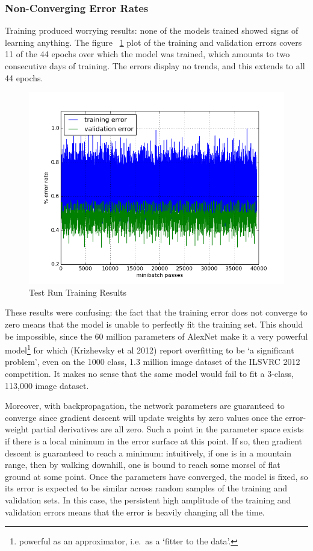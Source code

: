 \documentclass[a4paper,11pt]{article}
\begin{document}
\subsubsection{Non-Converging Error Rates}

Training produced worrying results: none of the models trained showed signs of learning anything. The figure ~\ref{f28} plot of the training and validation errors covers 11 of the 44 epochs over which the model was trained, which amounts to two consecutive days of training. The errors display no trends, and this extends to all 44 epochs.

\begin{figure}[!h]
	\centering
	\includegraphics[scale=0.5]{images/test_run.png}
	\caption{Test Run Training Results}
    \label{f28}
\end{figure}

These results were confusing: the fact that the training error does not converge to zero means that the model is unable to perfectly fit the training set. This should be impossible, since the 60 million parameters of AlexNet make it a very powerful model\footnote{powerful as an approximator, i.e.\ as a `fitter to the data'.} for which (Krizhevsky et al 2012) report overfitting to be `a significant problem', even on the 1000 class, 1.3 million image dataset of the ILSVRC 2012 competition. It makes no sense that the same model would fail to fit a 3-class, 113,000 image dataset.

Moreover, with backpropagation, the network parameters are guaranteed to converge \cite{DL-book} since gradient descent will update weights by zero values once the error-weight partial derivatives are all zero. Such a point in the parameter space exists if there is a local minimum in the error surface at this point. If so, then gradient descent is guaranteed to reach a minimum: intuitively, if one is in a mountain range, then by walking downhill, one is bound to reach some morsel of flat ground at some point. Once the parameters have converged, the model is fixed, so its error is expected to be similar across random samples of the training and validation sets. In this case, the persistent high amplitude of the training and validation errors means that the error is heavily changing all the time.
\end{document}

